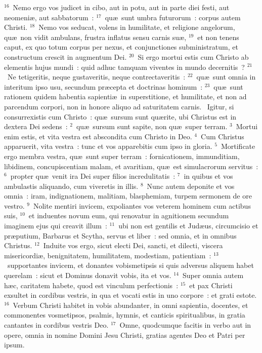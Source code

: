 ${}^{16}$~Nemo ergo vos judicet in cibo, aut in potu, aut in parte diei festi, aut neomeni\ae , aut sabbatorum~:
${}^{17}$~qu\ae\ sunt umbra futurorum~: corpus autem Christi.
${}^{18}$~Nemo vos seducat, volens in humilitate, et religione angelorum, qu\ae\ non vidit ambulans, frustra inflatus sensu carnis su\ae ,
${}^{19}$~et non tenens caput, ex quo totum corpus per nexus, et conjunctiones subministratum, et constructum crescit in augmentum Dei.
${}^{20}$~Si ergo mortui estis cum Christo ab elementis hujus mundi~: quid adhuc tamquam viventes in mundo decernitis~?
${}^{21}$~Ne tetigeritis, neque gustaveritis, neque contrectaveritis~:
${}^{22}$~qu\ae\ sunt omnia in interitum ipso usu, secundum pr\ae cepta et doctrinas hominum~:
${}^{23}$~qu\ae\ sunt rationem quidem habentia sapienti\ae\ in superstitione, et humilitate, et non ad parcendum corpori, non in honore aliquo ad saturitatem carnis.
~Igitur, si consurrexistis cum Christo~: qu\ae\ sursum sunt qu\ae rite, ubi Christus est in dextera Dei sedens~:
${}^{2}$~qu\ae\ sursum sunt sapite, non qu\ae\ super terram.
${}^{3}$~Mortui enim estis, et vita vestra est abscondita cum Christo in Deo.
${}^{4}$~Cum Christus apparuerit, vita vestra~: tunc et vos apparebitis cum ipso in gloria.
${}^{5}$~Mortificate ergo membra vestra, qu\ae\ sunt super terram~: fornicationem, immunditiam, libidinem, concupiscentiam malam, et avaritiam, qu\ae\ est simulacrorum servitus~:
${}^{6}$~propter qu\ae\ venit ira Dei super filios incredulitatis~:
${}^{7}$~in quibus et vos ambulastis aliquando, cum viveretis in illis.
${}^{8}$~Nunc autem deponite et vos omnia~: iram, indignationem, malitiam, blasphemiam, turpem sermonem de ore vestro.
${}^{9}$~Nolite mentiri invicem, expoliantes vos veterem hominem cum actibus suis,
${}^{10}$~et induentes novum eum, qui renovatur in agnitionem secundum imaginem ejus qui creavit illum~:
${}^{11}$~ubi non est gentilis et Jud\ae us, circumcisio et pr\ae putium, Barbarus et Scytha, servus et liber~: sed omnia, et in omnibus Christus.
${}^{12}$~Induite vos ergo, sicut electi Dei, sancti, et dilecti, viscera misericordi\ae , benignitatem, humilitatem, modestiam, patientiam~:
${}^{13}$~supportantes invicem, et donantes vobismetipsis si quis adversus aliquem habet querelam~: sicut et Dominus donavit vobis, ita et vos.
${}^{14}$~Super omnia autem h\ae c, caritatem habete, quod est vinculum perfectionis~:
${}^{15}$~et pax Christi exsultet in cordibus vestris, in qua et vocati estis in uno corpore~: et grati estote.
${}^{16}$~Verbum Christi habitet in vobis abundanter, in omni sapientia, docentes, et commonentes vosmetipsos, psalmis, hymnis, et canticis spiritualibus, in gratia cantantes in cordibus vestris Deo.
${}^{17}$~Omne, quodcumque facitis in verbo aut in opere, omnia in nomine Domini Jesu Christi, gratias agentes Deo et Patri per ipsum.


